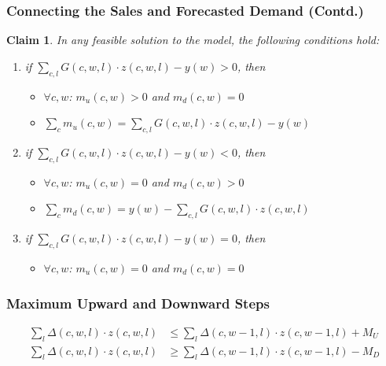 \documentclass[xcolor=table]{beamer}
\newtheorem{claim}{Claim}
\begin{document}
\begin{frame}[t]
\frametitle{Connecting the Sales and Forecasted Demand (Contd.)}
  \begin{claim}
In any feasible solution to the model, the following conditions hold:

\begin{enumerate}
  \item if $\sum_{c, l} G(c, w, l) \cdot z(c, w, l) - y(w) > 0$, then

\begin{itemize}
  \item $\forall c, w$: $m_u(c, w) > 0$ and $m_d(c, w) = 0$
  \item $ \sum_{c} m_u(c, w) = \sum_{c, l} G(c, w, l) \cdot z(c, w, l) - y(w)$
\end{itemize}

\pause

\item if $\sum_{c, l} G(c, w, l) \cdot z(c, w, l) - y(w) < 0$, then

\begin{itemize}
  \item $\forall c, w$: $m_u(c, w) = 0$ and $m_d(c, w) > 0$
  \item $ \sum_{c} m_d(c, w) = y(w) - \sum_{c, l} G(c, w, l) \cdot z(c, w, l)$
\end{itemize}

\pause

\item  if $\sum_{c, l} G(c, w, l) \cdot z(c, w, l) - y(w) = 0$, then

\begin{itemize}
  \item $\forall c, w$: $m_u(c, w) = 0$ and $m_d(c, w) = 0$
\end{itemize}

\end{enumerate}
\end{claim}
\end{frame}

\begin{frame}[t]
  \frametitle{Maximum Upward and Downward Steps}
\begin{align*}
\sum_{l} \Delta(c, w, l) \cdot z(c, w, l) & \leq \sum_{l} \Delta(c, w - 1, l)
  \cdot z(c, w - 1, l) + M_U \\
\sum_{l} \Delta(c, w, l) \cdot z(c, w, l) & \geq \sum_{l} \Delta(c, w - 1, l)
  \cdot z(c, w - 1, l) - M_D
\end{align*}
\end{frame}
\end{document}
